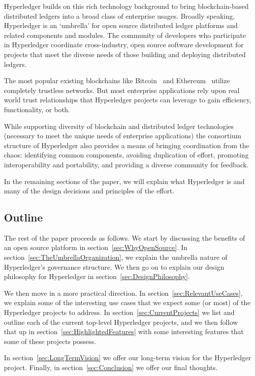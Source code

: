 Hyperledger builds on this rich technology background to bring blockchain-based distributed ledgers into a broad class of enterprise usages.  Broadly speaking, Hyperledger is an `umbrella’ for open source distributed ledger platforms and related components and modules. The community of developers who participate in Hyperledger coordinate cross-industry, open source software development for projects that meet the diverse needs of those building and deploying distributed ledgers. 

The most popular existing blockchains like Bitcoin~\cite{Nak08} and Ethereum~\cite{But13} utilize completely trustless networks.  But most enterprise applications rely upon real world trust relationships that Hyperledger projects can leverage to gain efficiency, functionality, or both.

While supporting diversity of blockchain and distributed ledger technologies (necessary to meet the unique needs of enterprise applications) the consortium structure of Hyperledger also provides a means of bringing coordination from the chaos: identifying common components, avoiding duplication of effort, promoting interoperability and portability, and providing a diverse community for feedback.

In the remaining sections of the paper, we will explain what Hyperledger is and many of the design decisions and principles of the effort.

\subsection{Outline}
The rest of the paper proceeds as follows.  We start by discussing the benefits of an open source platform in section~\ref{sec:WhyOpenSource}.  In section~\ref{sec:TheUmbrellaOrganization}, we explain the umbrella nature of Hyperledger's governance structure.  We then go on to explain our design philosophy for Hyperledger in section~\ref{sec:DesignPhilosophy}.

We then move in a more practical direction.  In section~\ref{sec:RelevantUseCases}, we explain some of the interesting use cases that we expect some (or most) of the Hyperledger projects to address.  In section~\ref{sec:CurrentProjects} we list and outline each of the current top-level Hyperledger projects, and we then follow that up in section~\ref{sec:HighlightedFeatures} with some interesting features that some of these projects possess.

In section~\ref{sec:LongTermVision} we offer our long-term vision for the Hyperledger project.  Finally, in section~\ref{sec:Conclusion} we offer our final thoughts.